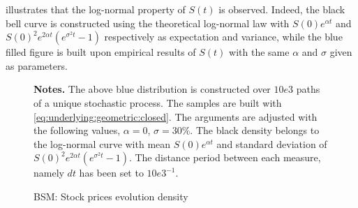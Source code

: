 \documentclass[12pt,a4paper]{report}
\begin{document}
 illustrates that the log-normal property  of $S(t)$ is observed. 
Indeed, the black bell curve is constructed using the theoretical log-normal law with $S(0) e^{\alpha t}$ and $S(0)^2 e^{2 \alpha t} (e^{\sigma^2 t} - 1)$ respectively as expectation and variance, while the blue filled figure is built upon empirical results of $S(t)$ with the same $\alpha$ and $\sigma$ given as parameters.

\begin{figure}[!h]
\centering 

\caption{BSM: Stock prices evolution density}
\label{p:logdensity}
  \begin{changemargin}{0.5cm}{0.5cm}
  \medskip
\footnotesize
{}\textbf{Notes.} The above blue distribution is constructed over $10e3$ paths of a unique stochastic process. 
The samples are built with \cref{eq:underlying:geometric:closed}. 
The arguments are adjusted with the following values, $\alpha = 0$, $\sigma = 30\%$. 
The black density belongs to the log-normal curve with mean $S(0) e^{\alpha t}$ and standard deviation of $S(0)^2 e^{2 \alpha t} (e^{\sigma^2 t} - 1)$. 
The distance period between each measure, namely $dt$ has been set to $10e3^{-1}$.  
\end{changemargin}
\end{figure}
\end{document}

